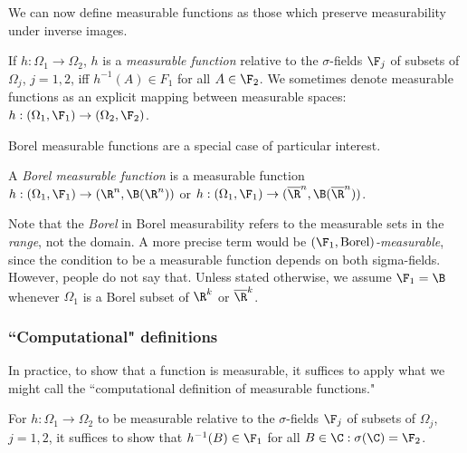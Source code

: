 \documentclass{article} %
\begin{document}
We can now define measurable functions as those which preserve measurability under inverse images.
   
\begin{definition}
If $h : \Omega_1 \to \Omega_2$, $h$ is a \textit{measurable function} relative to the $\sigma$-fields $\F_j$ of subsets of $\Omega_j$, $j=1,2$, iff $h^{-1}(A) \in F_1$ for all $A \in \F_2$.  We sometimes denote measurable functions as an explicit mapping between measurable spaces: $h : (\Omega_1, \F_1) \to (\Omega_2, \F_2)$.
\label{def:measurable_function}
\end{definition}


Borel measurable functions are a special case of particular interest.  
 
\begin{definition}
A \textit{Borel measurable function} is a measurable function $h : (\Omega_1, \F_1) \to (\R^n, \B(\R^n))$ or  $h : (\Omega_1, \F_1) \to (\overline{\R}^n, \B(\overline{\R}^n))$.  
\label{def:borel_measurable_function}
\end{definition}

Note that the \textit{Borel} in Borel measurability refers to the measurable sets in the \textit{range}, not the domain.  A more precise term would be \textit{$(\F_1, \text{Borel})$-measurable}, since the condition to be a measurable function depends on both sigma-fields.  However, people do not say that.  Unless stated otherwise, we assume $\F_1 = \B$ whenever $\Omega_1$ is a Borel subset of $\R^k$ or $\overline{\R}^k$.

\subsubsection{``Computational" definitions}
In practice, to show that a function is measurable, it suffices to apply what we might call the ``computational definition of measurable functions."

\begin{claim}{}
For $h : \Omega_1 \to \Omega_2$ to be measurable relative to the $\sigma$-fields $\F_j$ of subsets of $\Omega_j$, $j=1,2$, it suffices to show that $h^{-1}(B) \in \F_1$ for all $B \in \C : \sigma(\C) = \F_2$. 
\label{claim:computational_def_measurability}	
\end{claim}
\end{document}

